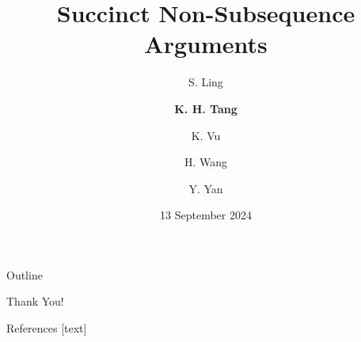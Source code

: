 \documentclass{beamer}
\title{Succinct Non-Subsequence Arguments}
\date{13 September 2024}
\author{ S. Ling\and \textbf{K. H. Tang}\and K. Vu\and H. Wang\and Y. Yan}
\begin{document}
	\begin{frame}
		\titlepage
	\end{frame}
	
	\begin{frame}{Outline}
		\tableofcontents
	\end{frame}
	
	
	
	
	
	
	
	
	\begin{frame}{}
		\begin{center}
			{\fontsize{20}{20}\selectfont Thank You!}
		\end{center}
	\end{frame}
	
	\begin{frame}[allowframebreaks]{References}
		
		
		
	\end{frame}
\end{document}
